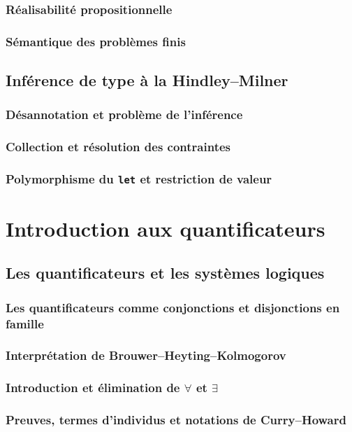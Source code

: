 \subsection{Réalisabilité propositionnelle}
\subsection{Sémantique des problèmes finis}

\section{Inférence de type à la Hindley--Milner}
\subsection{Désannotation et problème de l'inférence}
\subsection{Collection et résolution des contraintes}
\subsection{Polymorphisme du \texttt{let} et restriction de valeur}


\chapter{Introduction aux quantificateurs}
\label{chapter-quantifiers}

\section{Les quantificateurs et les systèmes logiques}
\subsection{Les quantificateurs comme conjonctions et disjonctions en famille}
\subsection{Interprétation de Brouwer--Heyting--Kolmogorov}
\subsection{Introduction et élimination de $\forall$ et $\exists$}
\subsection{Preuves, termes d'individus et notations de Curry--Howard}
